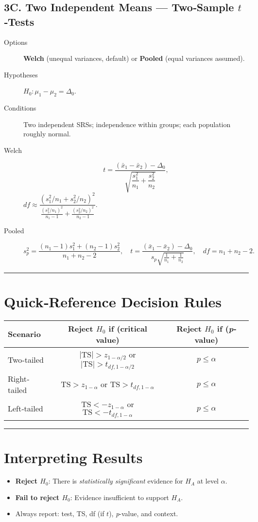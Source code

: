 \documentclass[12pt]{article}
\begin{document}
\subsection*{3C. Two Independent Means — Two‐Sample $t$‐Tests}
\begin{description}
  \item[Options] \textbf{Welch} (unequal variances, default) or \textbf{Pooled} (equal variances assumed).
  \item[Hypotheses] $H_0\!: \mu_1-\mu_2=\Delta_0$.
  \item[Conditions] Two independent SRSs; independence within groups; each population roughly normal.
  \item[Welch] \[ t = \dfrac{(\bar x_1-\bar x_2)-\Delta_0}{\sqrt{\dfrac{s_1^2}{n_1}+\dfrac{s_2^2}{n_2}}}, \]
    $df \approx \dfrac{(s_1^2/n_1+s_2^2/n_2)^2}{\tfrac{(s_1^2/n_1)^2}{n_1-1}+\tfrac{(s_2^2/n_2)^2}{n_2-1}}$.
  \item[Pooled] \[ s_p^2 = \dfrac{(n_1-1)s_1^2 + (n_2-1)s_2^2}{n_1+n_2-2}, \quad t = \dfrac{(\bar x_1-\bar x_2)-\Delta_0}{s_p\sqrt{\tfrac1{n_1}+\tfrac1{n_2}}}, \quad df=n_1+n_2-2. \]
\end{description}

\bigskip\hrule\bigskip

\section*{Quick‐Reference Decision Rules}
\begin{center}
\begin{tabular}{|l|c|c|}
\hline
\textbf{Scenario} & \textbf{Reject $H_0$ if (critical value)} & \textbf{Reject $H_0$ if (\emph{p}‐value)} \\\hline
Two‐tailed & $|\text{TS}|>z_{1-\alpha/2}$ or $|\text{TS}|>t_{df,1-\alpha/2}$ & $p\le\alpha$ \\
Right‐tailed & $\text{TS}>z_{1-\alpha}$ or $\text{TS}>t_{df,1-\alpha}$ & $p\le\alpha$ \\
Left‐tailed & $\text{TS}< -z_{1-\alpha}$ or $\text{TS}< -t_{df,1-\alpha}$ & $p\le\alpha$ \\\hline
\end{tabular}
\end{center}

\bigskip\hrule\bigskip

\section*{Interpreting Results}
\begin{itemize}
  \item \textbf{Reject $H_0$}: There is \emph{statistically significant} evidence for $H_A$ at level $\alpha$.
  \item \textbf{Fail to reject $H_0$}: Evidence insufficient to support $H_A$.
  \item Always report: test, TS, df (if $t$), \emph{p}-value, and context.
\end{itemize}
\end{document}
